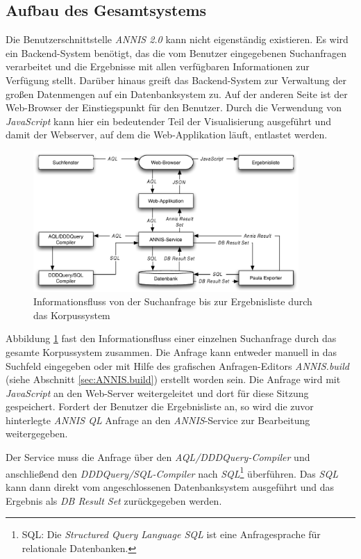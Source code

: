 \subsection{Aufbau des Gesamtsystems}

Die Benutzerschnittstelle \emph{ANNIS 2.0} kann nicht eigenständig existieren. Es wird ein Backend-System benötigt, das die vom Benutzer eingegebenen Suchanfragen verarbeitet und die Ergebnisse mit allen verfügbaren Informationen zur Verfügung stellt. Darüber hinaus greift das Backend-System zur Verwaltung der großen Datenmengen auf ein Datenbanksystem zu. Auf der anderen Seite ist der Web-Browser der Einstiegspunkt für den Benutzer. Durch die Verwendung von \emph{JavaScript} kann hier ein bedeutender Teil der Visualisierung ausgeführt und damit der Webserver, auf dem die Web-Applikation läuft, entlastet werden.

\begin{figure}[H]
	\centering
	\includegraphics*[width=0.9\textwidth]{figures/DA/Informationsfluss.pdf}
	\caption{Informationsfluss von der Suchanfrage bis zur Ergebnisliste durch das Korpussystem}\label{fig:Informationsfluss}
\end{figure}

Abbildung \ref{fig:Informationsfluss} fast den Informationsfluss einer einzelnen Suchanfrage durch das gesamte Korpussystem zusammen. Die Anfrage kann entweder manuell in das Suchfeld eingegeben oder mit Hilfe des grafischen Anfragen-Editors \emph{ANNIS.build} (siehe Abschnitt \ref{sec:ANNIS.build}) erstellt worden sein. Die Anfrage wird mit \emph{JavaScript} an den Web-Server weitergeleitet und dort für diese Sitzung gespeichert. Fordert der Benutzer die Ergebnisliste an, so wird die zuvor hinterlegte \emph{ANNIS QL} Anfrage an den \emph{ANNIS}-Service zur Bearbeitung weitergegeben. 

Der Service muss die Anfrage über den \emph{AQL/DDDQuery-Compiler} und anschließend den \emph{DDDQuery/SQL-Compiler} nach \emph{SQL}\footnote{SQL: Die \emph{Structured Query Language SQL} ist eine Anfragesprache für relationale Datenbanken.} überführen. Das \emph{SQL} kann dann direkt vom angeschlossenen Datenbanksystem ausgeführt und das Ergebnis als  \emph{DB Result Set} zurückgegeben werden.

